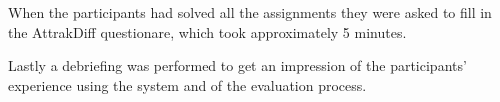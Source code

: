When the participants had solved all the assignments they were asked to fill in the AttrakDiff questionare, which took approximately 5 minutes.

Lastly a debriefing was performed to get an impression of the participants' experience using the system and of the evaluation process.
